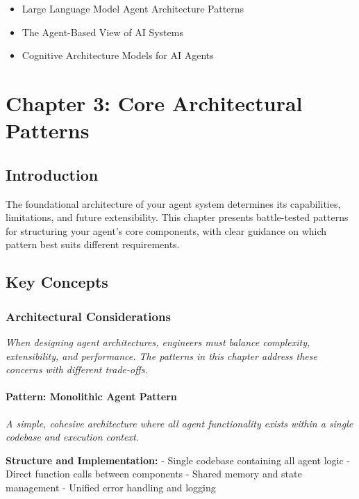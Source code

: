 \documentclass[11pt,oneside]{book}
\providecommand{\tightlist}{%
  \setlength{\itemsep}{0pt}\setlength{\parskip}{0pt}}
\begin{document}
\begin{itemize}
\tightlist
\item
  Large Language Model Agent Architecture Patterns
\item
  The Agent-Based View of AI Systems
\item
  Cognitive Architecture Models for AI Agents
\end{itemize}

\chapter{Chapter 3: Core Architectural
Patterns}\label{chapter-3-core-architectural-patterns}

\section{Introduction}\label{introduction-2}

The foundational architecture of your agent system determines its
capabilities, limitations, and future extensibility. This chapter
presents battle-tested patterns for structuring your agent's core
components, with clear guidance on which pattern best suits different
requirements.

\section{Key Concepts}\label{key-concepts}

\subsection{Architectural
Considerations}\label{architectural-considerations}

\emph{When designing agent architectures, engineers must balance
complexity, extensibility, and performance. The patterns in this chapter
address these concerns with different trade-offs.}

\subsubsection{Pattern: Monolithic Agent
Pattern}\label{pattern-monolithic-agent-pattern}

\emph{A simple, cohesive architecture where all agent functionality
exists within a single codebase and execution context.}

\textbf{Structure and Implementation:} - Single codebase containing all
agent logic - Direct function calls between components - Shared memory
and state management - Unified error handling and logging
\end{document}
